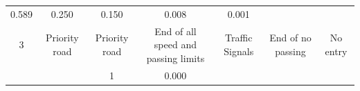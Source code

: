 \documentclass[11pt]{article}
\begin{document}
\begin{longtable}[]{@{}ccccccc@{}}
\begin{minipage}[t]{0.04\columnwidth}
0.589\strut
\end{minipage} & \begin{minipage}[t]{0.04\columnwidth}\centering\strut
0.250\strut
\end{minipage} & \begin{minipage}[t]{0.04\columnwidth}\centering\strut
0.150\strut
\end{minipage} & \begin{minipage}[t]{0.04\columnwidth}\centering\strut
0.008\strut
\end{minipage} & \begin{minipage}[t]{0.04\columnwidth}\centering\strut
0.001\strut
\end{minipage}\tabularnewline
\begin{minipage}[t]{0.04\columnwidth}\centering\strut
3\strut
\end{minipage} & \begin{minipage}[t]{0.04\columnwidth}\centering\strut
Priority road\strut
\end{minipage} & \begin{minipage}[t]{0.04\columnwidth}\centering\strut
Priority road\strut
\end{minipage} & \begin{minipage}[t]{0.04\columnwidth}\centering\strut
End of all speed and passing limits\strut
\end{minipage} & \begin{minipage}[t]{0.04\columnwidth}\centering\strut
Traffic Signals\strut
\end{minipage} & \begin{minipage}[t]{0.04\columnwidth}\centering\strut
End of no passing\strut
\end{minipage} & \begin{minipage}[t]{0.04\columnwidth}\centering\strut
No entry\strut
\end{minipage}\tabularnewline
\begin{minipage}[t]{0.04\columnwidth}\centering\strut
\strut
\end{minipage} & \begin{minipage}[t]{0.04\columnwidth}\centering\strut
\strut
\end{minipage} & \begin{minipage}[t]{0.04\columnwidth}\centering\strut
1\strut
\end{minipage} & \begin{minipage}[t]{0.04\columnwidth}\centering\strut
0.000\strut
\end{minipage} & \begin{minipage}[t]{0.04\columnwidth}\centering\strut

\end{minipage}
\end{longtable}
\end{document}
